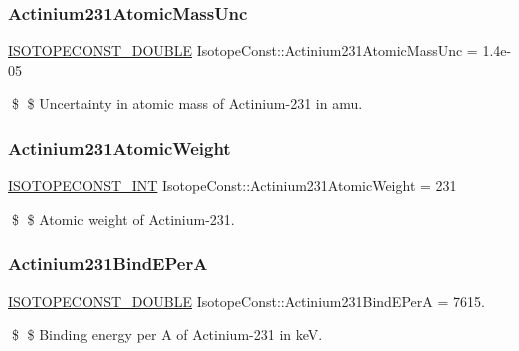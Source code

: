 \subsubsection{\texorpdfstring{Actinium231\+Atomic\+Mass\+Unc}{Actinium231AtomicMassUnc}}
{\footnotesize\ttfamily \mbox{\hyperlink{group___isotope_const-_macros_ga8f45a7272ce02c0b4c65c44636ed719a}{I\+S\+O\+T\+O\+P\+E\+C\+O\+N\+S\+T\+\_\+\+D\+O\+U\+B\+LE}} Isotope\+Const\+::\+Actinium231\+Atomic\+Mass\+Unc = 1.\+4e-\/05}

\$ \$ Uncertainty in atomic mass of Actinium-\/231 in amu. \mbox{\label{group___isotope_const-_actinium-_ac231_gad10dfbfe69570aa3a6c0988787635214}} 
\subsubsection{\texorpdfstring{Actinium231\+Atomic\+Weight}{Actinium231AtomicWeight}}
{\footnotesize\ttfamily \mbox{\hyperlink{group___isotope_const-_macros_ga5f18360b3e99483a35c32d789e62621c}{I\+S\+O\+T\+O\+P\+E\+C\+O\+N\+S\+T\+\_\+\+I\+NT}} Isotope\+Const\+::\+Actinium231\+Atomic\+Weight = 231}

\$ \$ Atomic weight of Actinium-\/231. \mbox{\label{group___isotope_const-_actinium-_ac231_gae512ff5c5a1417d3e8d65737d4dfc4f4}} 
\subsubsection{\texorpdfstring{Actinium231\+Bind\+E\+PerA}{Actinium231BindEPerA}}
{\footnotesize\ttfamily \mbox{\hyperlink{group___isotope_const-_macros_ga8f45a7272ce02c0b4c65c44636ed719a}{I\+S\+O\+T\+O\+P\+E\+C\+O\+N\+S\+T\+\_\+\+D\+O\+U\+B\+LE}} Isotope\+Const\+::\+Actinium231\+Bind\+E\+PerA = 7615.}

\$ \$ Binding energy per A of Actinium-\/231 in keV. \mbox{\label{group___isotope_const-_actinium-_ac231_gae1be4bd29581ac3f9dc857e1a3a7aa49}} 
